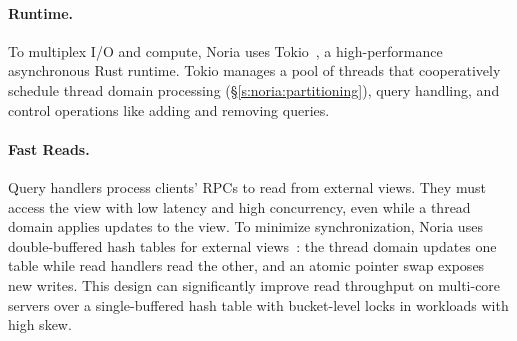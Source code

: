 \paragraph{Runtime.}
To multiplex I/O and compute, Noria uses Tokio~\cite{tokio}, a high-performance
asynchronous Rust runtime. Tokio manages a pool of threads that cooperatively
schedule thread domain processing (\S\ref{s:noria:partitioning}), query
handling, and control operations like adding and removing queries.

\paragraph{Fast Reads.}
Query handlers process clients' RPCs to read from external views. They must
access the view with low latency and high concurrency, even while a thread
domain applies updates to the view. To minimize synchronization, Noria uses
double-buffered hash tables for external views~\cite{evmap}: the thread domain
updates one table while read handlers read the other, and an atomic pointer
swap exposes new writes. This design can significantly improve read throughput
on multi-core servers over a single-buffered hash table with bucket-level locks
in workloads with high skew.
